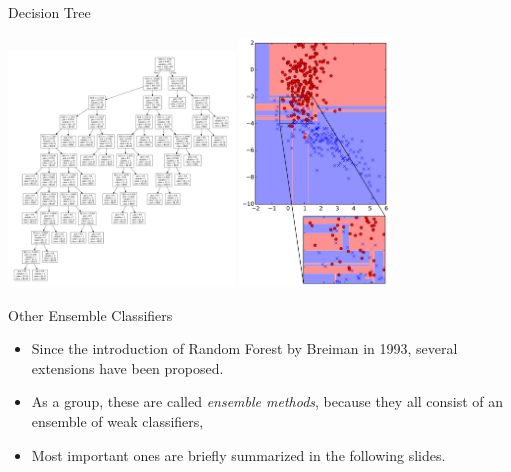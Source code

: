 \documentclass[10pt, aspectratio=169]{beamer} %
\begin{document}
\begin{frame}[fragile]{Decision Tree}
\begin{center}
\includegraphics[width = 0.45\textwidth]{tree_graph_2.pdf}	\qquad
\includegraphics[width = 0.3\textwidth]{tree_2.pdf}	
\end{center}
\end{frame}


\begin{frame}[fragile, allowframebreaks=0.8]{Other Ensemble Classifiers}
\begin{itemize}
\item Since the introduction of Random Forest by Breiman in 1993, several extensions have been proposed.
\item As a group, these are called \emph{ensemble methods}, because they all consist of an ensemble of
weak classifiers,
\item Most important ones are briefly summarized in the following slides.
\end{itemize}
\end{frame}
	
\end{document}
